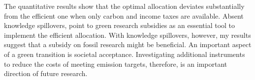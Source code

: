  
 The quantitative results show that the optimal allocation deviates substantially from the efficient one when only carbon and income taxes are available. Absent knowledge spillovers, \cite{Acemoglu2012TheChange} point to green research subsidies as an essential tool to implement the efficient allocation. With knowledge spillovers, however, my results suggest that a subsidy on fossil research might be beneficial. An important aspect of a green transition is societal acceptance. Investigating additional instruments to reduce the costs of meeting emission targets, therefore, is an important direction of future research.
 
 
\clearpage

